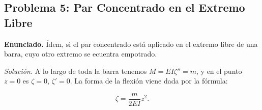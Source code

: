 \documentclass{article}
\begin{document}
\subsection*{Problema 5: Par Concentrado en el Extremo Libre}
\textbf{Enunciado.} Ídem, si el par concentrado está aplicado en el extremo libre de una barra, cuyo otro extremo se ecuentra empotrado.

\textit{Solución.} A lo largo de toda la barra tenemos $M = EI\zeta'' = m$, y en el punto $z = 0$ es $\zeta = 0$, $\zeta' = 0$. La forma de la flexión viene dada por la fórmula:

$$
\zeta = \frac{m}{2EI} z^2.
$$
\end{document}
